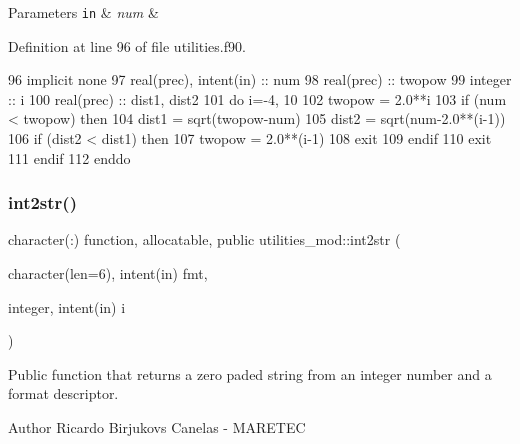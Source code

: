 \begin{DoxyParams}[1]{Parameters}
\mbox{\tt in}  & {\em num} & \\
\hline
\end{DoxyParams}


Definition at line 96 of file utilities.\+f90.


\begin{DoxyCode}
96     \textcolor{keywordtype}{implicit none}
97     \textcolor{keywordtype}{real(prec)}, \textcolor{keywordtype}{intent(in)} :: num
98     \textcolor{keywordtype}{real(prec)} :: twopow
99     \textcolor{keywordtype}{integer} :: i
100     \textcolor{keywordtype}{real(prec)} :: dist1, dist2
101     \textcolor{keywordflow}{do} i=-4, 10
102         twopow = 2.0**i
103         \textcolor{keywordflow}{if} (num < twopow) \textcolor{keywordflow}{then}
104             dist1 = sqrt(twopow-num)
105             dist2 = sqrt(num-2.0**(i-1))
106             \textcolor{keywordflow}{if} (dist2 < dist1) \textcolor{keywordflow}{then}
107                 twopow = 2.0**(i-1)
108                 \textcolor{keywordflow}{exit}
109 \textcolor{keywordflow}{            endif}
110             \textcolor{keywordflow}{exit}
111 \textcolor{keywordflow}{        endif}
112 \textcolor{keywordflow}{    enddo}
\end{DoxyCode}
\mbox{\label{namespaceutilities__mod_ab414aa8d1299fc8dfb5941113d050dd3}} 
\subsubsection{\texorpdfstring{int2str()}{int2str()}}
{\footnotesize\ttfamily character(\+:) function, allocatable, public utilities\+\_\+mod\+::int2str (\begin{DoxyParamCaption}\item[{character(len=6), intent(in)}]{fmt,  }\item[{integer, intent(in)}]{i }\end{DoxyParamCaption})}



Public function that returns a zero paded string from an integer number and a format descriptor. 

\begin{DoxyAuthor}{Author}
Ricardo Birjukovs Canelas -\/ M\+A\+R\+E\+T\+EC 
\end{DoxyAuthor}

